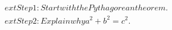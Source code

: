 \documentclass[preview]{standalone}
\begin{document}
\begin{align*}
ext{Step 1: Start with the Pythagorean theorem.} \\	ext{Step 2: Explain why } a^2 + b^2 = c^2.
\end{align*}
\end{document}
